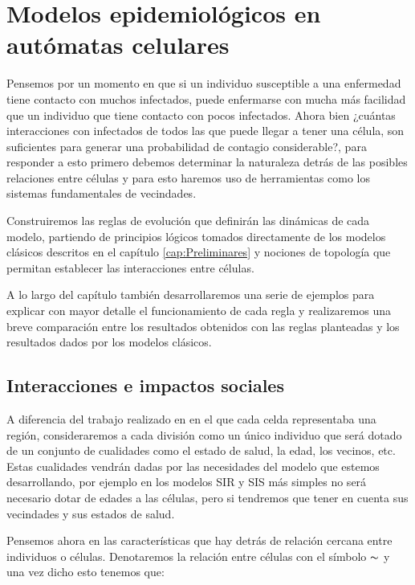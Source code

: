 \chapter{Modelos epidemiológicos en autómatas celulares}\label{cap:Modelos epidemiológicos en AC}

Pensemos por un momento en que si un individuo susceptible a una enfermedad tiene contacto con muchos infectados, puede enfermarse con mucha más facilidad que un individuo que tiene contacto con pocos infectados. Ahora bien ¿cuántas interacciones con infectados de todos las que puede llegar a tener una célula, son suficientes para generar una probabilidad de contagio considerable?, para responder a esto primero debemos determinar la naturaleza detrás de las posibles relaciones entre células y para esto haremos uso de herramientas como los sistemas fundamentales de vecindades.

Construiremos las reglas de evolución que definirán las dinámicas de cada modelo, partiendo de principios lógicos tomados directamente de los modelos clásicos descritos en el capítulo \ref{cap:Preliminares} y nociones de topología que permitan establecer las interacciones entre células.

A lo largo del capítulo también desarrollaremos una serie de ejemplos para explicar con mayor detalle el funcionamiento de cada regla y realizaremos una breve comparación entre los resultados obtenidos con las reglas planteadas y los resultados dados por los modelos clásicos.

\section{Interacciones e impactos sociales}\label{sec:InteraccionesEImpactosSociales}
A diferencia del trabajo realizado en \cite{populationDensity} en el que cada celda representaba una región, consideraremos a cada división como un único individuo que será dotado de un conjunto de cualidades como el estado de salud, la edad, los vecinos, etc. Estas cualidades vendrán dadas por las necesidades del modelo que estemos desarrollando, por ejemplo en los modelos SIR y SIS más simples no será necesario dotar de edades a las células, pero si tendremos que tener en cuenta sus vecindades y sus estados de salud.

Pensemos ahora en las características que hay detrás de relación cercana entre individuos o células. Denotaremos la relación entre células con el símbolo $\thicksim$ y una vez dicho esto tenemos que:

